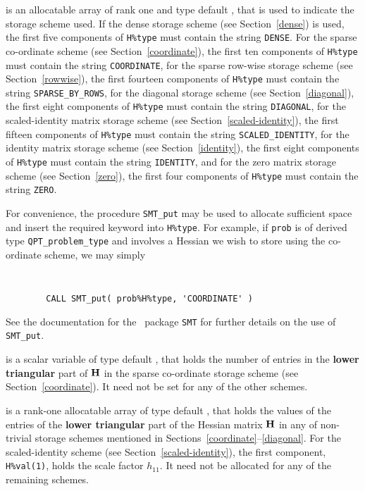 \documentclass{galahad}
\newcommand{\packagename}{QPT}
\begin{document}
\begin{description}
\begin{description}

 is an allocatable array of rank one and type default \character, that
is used to indicate the storage scheme used. If the dense storage scheme
(see Section~\ref{dense}) is used,
the first five components of {\tt H\%type} must contain the
string {\tt DENSE}.
For the sparse co-ordinate scheme (see Section~\ref{coordinate}),
the first ten components of {\tt H\%type} must contain the
string {\tt COORDINATE},
for the sparse row-wise storage scheme (see Section~\ref{rowwise}),
the first fourteen components of {\tt H\%type} must contain the
string {\tt SPARSE\_BY\_ROWS},
for the diagonal storage scheme (see Section~\ref{diagonal}),
the first eight components of {\tt H\%type} must contain the
string {\tt DIAGONAL},
for the scaled-identity matrix storage scheme
(see Section~\ref{scaled-identity}),
the first fifteen components of {\tt H\%type} must contain the
string {\tt SCALED\_IDENTITY},
for the identity matrix storage scheme
(see Section~\ref{identity}),
the first eight components of {\tt H\%type} must contain the
string {\tt IDENTITY}, and
for the zero matrix storage scheme
(see Section~\ref{zero}),
the first four components of {\tt H\%type} must contain the
string {\tt ZERO}.

For convenience, the procedure {\tt SMT\_put}
may be used to allocate sufficient space and insert the required keyword
into {\tt H\%type}.
For example, if {\tt prob} is of derived type {\tt \packagename\_problem\_type}
and involves a Hessian we wish to store using the co-ordinate scheme,
we may simply
{\tt
\begin{verbatim}
        CALL SMT_put( prob%H%type, 'COORDINATE' )
\end{verbatim}
}
\noindent
See the documentation for the \galahad\ package {\tt SMT}
for further details on the use of {\tt SMT\_put}.

 is a scalar variable of type default \integer, that
holds the number of entries in the {\bf lower triangular} part of ${\mathbf{H}}$
in the sparse co-ordinate storage scheme (see Section~\ref{coordinate}).
It need not be set for any of the other schemes.

 is a rank-one allocatable array of type default \realdp, that holds
the values of the entries of the {\bf lower triangular} part
of the Hessian matrix ${\mathbf{H}}$ in any of non-trivial storage schemes
mentioned in Sections~\ref{coordinate}--\ref{diagonal}.
For the scaled-identity scheme (see Section~\ref{scaled-identity}),
the first component, {\tt H\%val(1)}, holds the scale factor $h_{11}$.
It need not be allocated for any of the remaining schemes.


\end{description}
\end{description}
\end{document}
